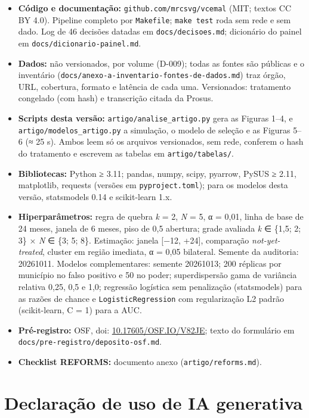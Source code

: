 \documentclass[
  11pt,
]{article}
\providecommand{\tightlist}{%
  \setlength{\itemsep}{0pt}\setlength{\parskip}{0pt}}
\begin{document}
\begin{itemize}
\tightlist
\item
  \textbf{Código e documentação:} \texttt{github.com/mrcsvg/vcemal} (MIT; textos CC BY 4.0). Pipeline completo por \texttt{Makefile}; \texttt{make\ test} roda sem rede e sem dado. Log de 46 decisões datadas em \texttt{docs/decisoes.md}; dicionário do painel em \texttt{docs/dicionario-painel.md}.
\item
  \textbf{Dados:} não versionados, por volume (D-009); todas as fontes são públicas e o inventário (\texttt{docs/anexo-a-inventario-fontes-de-dados.md}) traz órgão, URL, cobertura, formato e latência de cada uma. Versionados: tratamento congelado (com hash) e transcrição citada da Prosus.
\item
  \textbf{Scripts desta versão:} \texttt{artigo/analise\_artigo.py} gera as Figuras 1--4, e \texttt{artigo/modelos\_artigo.py} a simulação, o modelo de seleção e as Figuras 5--6 (≈ 25 s). Ambos leem só os arquivos versionados, sem rede, conferem o hash do tratamento e escrevem as tabelas em \texttt{artigo/tabelas/}.
\item
  \textbf{Bibliotecas:} Python ≥ 3.11; pandas, numpy, scipy, pyarrow, PySUS ≥ 2.11, matplotlib, requests (versões em \texttt{pyproject.toml}); para os modelos desta versão, statsmodels 0.14 e scikit-learn 1.x.
\item
  \textbf{Hiperparâmetros:} regra de quebra \emph{k} = 2, \emph{N} = 5, α = 0,01, linha de base de 24 meses, janela de 6 meses, piso de 0,5 abertura; grade avaliada \emph{k} ∈ \{1,5; 2; 3\} × \emph{N} ∈ \{3; 5; 8\}. Estimação: janela {[}−12, +24{]}, comparação \emph{not-yet-treated}, cluster em região imediata, α = 0,05 bilateral. Semente da auditoria: 20261011. Modelos complementares: semente 20261013; 200 réplicas por município no falso positivo e 50 no poder; superdispersão gama de variância relativa 0,25, 0,5 e 1,0; regressão logística sem penalização (statsmodels) para as razões de chance e \texttt{LogisticRegression} com regularização L2 padrão (scikit-learn, C = 1) para a AUC.
\item
  \textbf{Pré-registro:} OSF, doi: \href{https://doi.org/10.17605/OSF.IO/V82JE}{10.17605/OSF.IO/V82JE}; texto do formulário em \texttt{docs/pre-registro/deposito-osf.md}.
\item
  \textbf{Checklist REFORMS:} documento anexo (\texttt{artigo/reforms.md}).
\end{itemize}

\hypertarget{declarauxe7uxe3o-de-uso-de-ia-generativa}{%
\section{Declaração de uso de IA generativa}\label{declarauxe7uxe3o-de-uso-de-ia-generativa}}
\end{document}
